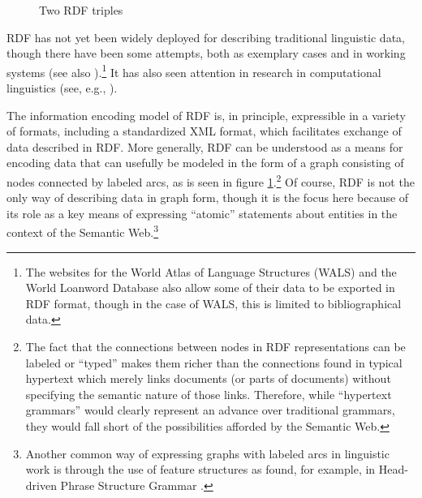 \documentclass[12pt]{article}
\newcommand{\fref}[1]{figure \ref{#1}}
\newcommand\namecite{\citet}
\renewcommand\cite{\citep}
\begin{document}
\begin{figure}[ht]
\centering
{}
\caption{Two RDF triples \label{RDFExample}}
\end{figure}

RDF has not yet been widely deployed for describing traditional linguistic data,
though there have been some attempts, both as exemplary cases \cite{Simons:2005}
and in working systems \cite{GoodParker:2006} (see also
\namecite[63--65]{Cysouw:2007:Social}).{\footnote{The websites for the World
Atlas of Language Structures (WALS) \cite{WALS:2011} and the World Loanword
Database \cite{WOLD} also allow some of their data to be exported in RDF format,
though in the case of WALS, this is limited to bibliographical data.}} It has
also seen attention in research in computational linguistics (see, e.g.,
\namecite{IdeEtAl:2003}).

The information encoding model of RDF is, in principle, expressible in a variety
of formats, including a standardized XML format, which facilitates exchange of
data described in RDF. More generally, RDF can be understood as a means for
encoding data that can usefully be modeled in the form of a graph consisting of
nodes connected by labeled arcs, as is seen in \fref{RDFExample}.{\footnote{The
fact that the connections between nodes in RDF representations can be labeled or
``typed'' makes them richer than the connections found in typical hypertext
which merely links documents (or parts of documents) without specifying the
semantic nature of those links. Therefore, while ``hypertext grammars''
\cite[29]{EvansDench:2006} would clearly represent an advance over traditional
grammars, they would fall short of the possibilities afforded by the Semantic
Web.}} Of course, RDF is not the only way of describing data in graph form,
though it is the focus here because of its role as a key means of expressing
``atomic'' statements about entities in the context of the Semantic
Web.{\footnote{Another common way of expressing graphs with labeled arcs in
linguistic work is through the use of feature structures as found, for example,
in Head-driven Phrase Structure Grammar \cite[50--51]{SWB:2003}.}}
\end{document}
